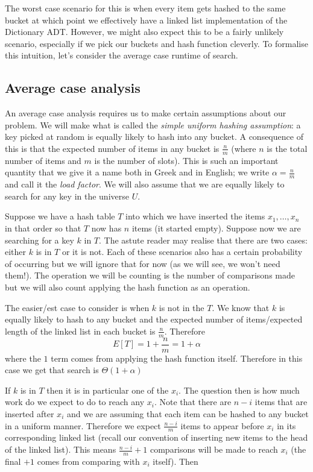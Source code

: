 The worst case scenario for this is when every item gets hashed to the same bucket at which point we effectively have a linked list implementation of the Dictionary ADT. However, we might also expect this to be a fairly unlikely scenario, especially if we pick our buckets and hash function cleverly. To formalise this intuition, let's consider the average case runtime of search.

\subsection{Average case analysis}
An average case analysis requires us to make certain assumptions about our problem. We will make what is called the \textit{simple uniform hashing assumption}: a key picked at random is equally likely to hash into any bucket. A consequence of this is that the expected number of items in any bucket is $\frac{n}{m}$ (where $n$ is the total number of items and $m$ is the number of slots). This is such an important quantity that we give it a name both in Greek and in English; we write $\alpha = \frac{n}{m}$ and call it the \textit{load factor}. We will also assume that we are equally likely to search for any key in the universe $U$.

Suppose we have a hash table $T$ into which we have inserted the items $x_1, \dots, x_n$ in that order so that $T$ now has $n$ items (it started empty).
Suppose now we are searching for a key $k$ in $T$. The astute reader may realise that there are two cases: either $k$ is in $T$ or it is not. Each of these scenarios also has a certain probability of occurring but we will ignore that for now (as we will see, we won't need them!). The operation we will be counting is the number of comparisons made but we will also count applying the hash function as an operation.

The easier/est case to consider is when $k$ is not in the $T$. We know that $k$ is equally likely to hash to any bucket and the expected number of items/expected length of the linked list in each bucket is $\frac{n}{m}$. Therefore
$$ E[T] = 1 + \frac{n}{m} = 1 + \alpha $$
where the $1$ term comes from applying the hash function itself. Therefore in this case we get that search is $\Theta(1 + \alpha)$

If $k$ is in $T$ then it is in particular one of the $x_i$. The question then is how much work do we expect to do to reach any $x_i$. Note that there are $n - i$ items that are inserted after $x_i$ and we are assuming that each item can be hashed to any bucket in a uniform manner. Therefore we expect $\frac{n - i}{m}$ items to appear before $x_i$ in its corresponding linked list (recall our convention of inserting new items to the head of the linked list). This means $\frac{n - i}{m} + 1$ comparisons will be made to reach $x_i$ (the final $+1$ comes from comparing with $x_i$ itself). Then


